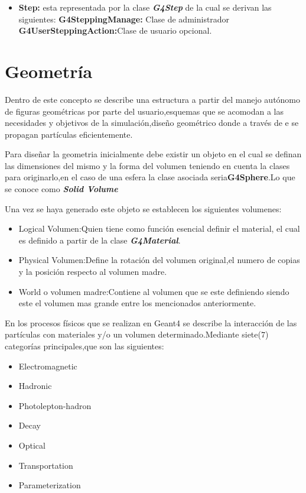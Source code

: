 \documentclass[12pt,fleqn]{book} %
\numberwithin{equation}{section} %
\numberwithin{figure}{section} %
\numberwithin{table}{section} %
\begin{document}
{\begin{itemize}
\item\textbf{Step:} esta representada por la clase \textbf{\textit{G4Step}} de la cual se derivan las siguientes:
\subitem\textbf{G4SteppingManage:} 
Clase de administrador
\subitem\textbf{G4UserSteppingAction:}Clase de usuario opcional.
\end{itemize}




\section {Geometría}
Dentro de este concepto se describe una estructura a partir del manejo autónomo de  figuras geométricas por parte del usuario,esquemas que se acomodan  a las necesidades y objetivos de la simulación,diseño geométrico donde a través de e se propagan partículas eficientemente. 

Para diseñar la geometria inicialmente debe existir un objeto en el cual se   definan las dimensiones del mismo y la forma del volumen teniendo en cuenta la clases para originarlo,en el caso de una esfera la clase asociada seria\textbf{G4Sphere}.Lo que se conoce como \textbf{\textit{Solid Volume}} 


Una vez se haya generado este objeto se establecen los siguientes volumenes: 
\begin{itemize}
 \item Logical Volumen:Quien tiene como función esencial definir el material, el cual es definido a partir de la  clase \textbf{\textit{ G4Material}}. 
 \item Physical Volumen:Define la rotación del volumen original,el numero de copias y la posición respecto al volumen madre.
\item World o volumen madre:Contiene al volumen que se este definiendo siendo este el volumen mas grande entre los mencionados anteriormente.
\end{itemize}



En los procesos físicos que se realizan en Geant4 se describe  la interacción de las partículas con  materiales y/o un volumen determinado.Mediante siete($7$) categorías principales,que son las siguientes:

\begin{itemize}
 \item Electromagnetic
\item  Hadronic
\item  Photolepton-hadron
\item  Decay
\item  Optical
\item  Transportation
\item  Parameterization
 \end{itemize}

}
\end{document}
